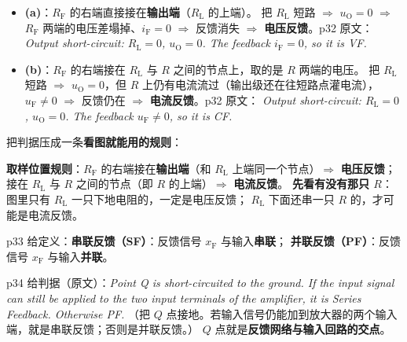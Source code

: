 \documentclass[11pt]{ctexart}
\begin{document}
\begin{itemize}
\item \textbf{(a)}：$R_{\mathrm{F}}$ 的右端直接接在\textbf{输出端}（$R_{\mathrm{L}}$ 的上端）。
把 $R_{\mathrm{L}}$ 短路 $\Rightarrow$ $u_{\mathrm{O}}=0$ $\Rightarrow$ $R_{\mathrm{F}}$ 两端的电压差塌掉、$i_{\mathrm{F}}=0$
$\Rightarrow$ 反馈消失 $\Rightarrow$ \textbf{电压反馈}。p32 原文：\textit{Output short-circuit: $R_{\mathrm{L}}=0$, $u_{\mathrm{O}}=0$.
The feedback $i_{\mathrm{F}}=0$, so it is VF.}
\item \textbf{(b)}：$R_{\mathrm{F}}$ 的右端接在 $R_{\mathrm{L}}$ 与 $R$ 之间的节点上，取的是 $R$ 两端的电压。
把 $R_{\mathrm{L}}$ 短路 $\Rightarrow$ $u_{\mathrm{O}}=0$，但 $R$ 上仍有电流流过（输出级还在往短路点灌电流），
$u_{\mathrm{F}}\neq0$ $\Rightarrow$ 反馈仍在 $\Rightarrow$ \textbf{电流反馈}。p32 原文：
\textit{Output short-circuit: $R_{\mathrm{L}}=0$, $u_{\mathrm{O}}=0$. The feedback $u_{\mathrm{F}}\neq0$, so it is CF.}
\end{itemize}


把判据压成一条\textbf{看图就能用的规则}：

\begin{cbox}
\textbf{取样位置规则}：$R_{\mathrm{F}}$ 的右端接在\textbf{输出端}（和 $R_{\mathrm{L}}$ 上端同一个节点）$\Rightarrow$ \textbf{电压反馈}；
接在 $R_{\mathrm{L}}$ 与 $R$ 之间的节点（即 $R$ 的上端）$\Rightarrow$ \textbf{电流反馈}。
\textbf{先看有没有那只 $R$}：图里只有 $R_{\mathrm{L}}$ 一只下地电阻的，一定是电压反馈；
$R_{\mathrm{L}}$ 下面还串一只 $R$ 的，才可能是电流反馈。
\end{cbox}


p33 给定义：\textbf{串联反馈（SF）}：反馈信号 $x_{\mathrm{F}}$ 与输入\textbf{串联}；
\textbf{并联反馈（PF）}：反馈信号 $x_{\mathrm{F}}$ 与输入\textbf{并联}。

p34 给判据（原文）：\textit{Point Q is short-circuited to the ground. If the input signal can still be
applied to the two input terminals of the amplifier, it is Series Feedback. Otherwise PF.}
（把 $Q$ 点接地。若输入信号仍能加到放大器的两个输入端，就是串联反馈；否则是并联反馈。）
$Q$ 点就是\textbf{反馈网络与输入回路的交点}。
\end{document}
